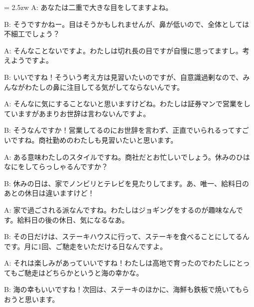 \documentclass[11pt]{amsart}
\title{}
\author{}
\newenvironment{hangall}[1]{\hangindent = 2.5zw\everypar{\hangindent = 2.5zw}}{}
\begin{document}
\maketitle
\begin{hangall}{}%
A: あなたは二重で大きな目をしてますよね。

B: そうですかねー。目はそうかもしれませんが、鼻が低いので、全体としては不細工でしょう？

A: そんなことないですよ。わたしは切れ長の目ですが自慢に思ってますし。考えようですよ。

B: いいですね！そういう考え方は見習いたいのですが、自意識過剰なので、みんながわたしの鼻に注目してる気がしてならないんです。

A: そんなに気にすることないと思いますけどね。わたしは証券マンで営業をしていますがあまりお世辞は言わないんですよ。

B: そうなんですか！営業してるのにお世辞を言わず、正直でいられるってすごいですね。商社勤めのわたしも見習いたいと思います。

A: ある意味わたしのスタイルですね。商社だとお忙しいでしょう。休みのひはなにをしてらっしゃるんですか？

B: 休みの日は、家でノンビリとテレビを見たりしてます。あ、唯一、給料日のあとの休日は違いますけど！

A: 家で過ごされる派なんですね。わたしはジョギングをするのが趣味なんです。給料日の後の休日、気になるなあ。

B: その日だけは、ステーキハウスに行って、ステーキを食べることにしてるんです。月に1回、ご馳走をいただける日なんですよ。

A: それは楽しみがあっていいですね！わたしは高地で育ったのでわたしにとってもご馳走はどちらかというと海の幸かな。

B: 海の幸もいいですね！次回は、ステーキのほかに、海鮮も鉄板で焼いてもらおうと思います。
\end{hangall}
\end{document}
